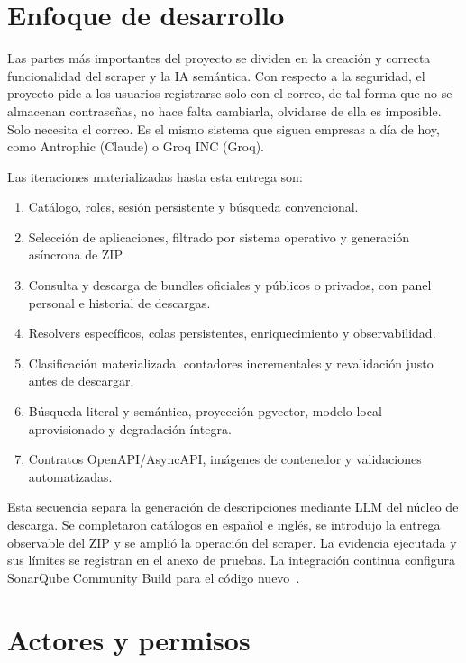 
\section{Enfoque de desarrollo}

Las partes más importantes del proyecto se dividen en la creación y correcta funcionalidad del scraper y la IA semántica. Con respecto a la seguridad, el proyecto pide a los usuarios registrarse solo con el correo, de tal forma que no se almacenan contraseñas, no hace falta cambiarla, olvidarse de ella es imposible. Solo necesita el correo. Es el mismo sistema que siguen empresas a día de hoy, como Antrophic (Claude) o Groq INC (Groq).

Las iteraciones materializadas hasta esta entrega son:

\begin{enumerate}
	\item Catálogo, roles, sesión persistente y búsqueda convencional.
	\item Selección de aplicaciones, filtrado por sistema operativo y generación asíncrona de ZIP.
	\item Consulta y descarga de bundles oficiales y públicos o privados, con panel personal e historial de descargas.
	\item Resolvers específicos, colas persistentes, enriquecimiento y observabilidad.
	\item Clasificación materializada, contadores incrementales y revalidación justo antes de descargar.
	\item Búsqueda literal y semántica, proyección pgvector, modelo local aprovisionado y degradación íntegra.
	\item Contratos OpenAPI/AsyncAPI, imágenes de contenedor y validaciones automatizadas.
\end{enumerate}

Esta secuencia separa la generación de descripciones mediante LLM del núcleo de descarga. Se completaron catálogos en español e inglés, se introdujo la entrega observable del ZIP y se amplió la operación del scraper. La evidencia ejecutada y sus límites se registran en el anexo de pruebas. La integración continua configura SonarQube Community Build para el código nuevo~\cite{sonarqube}.

\section{Actores y permisos}

